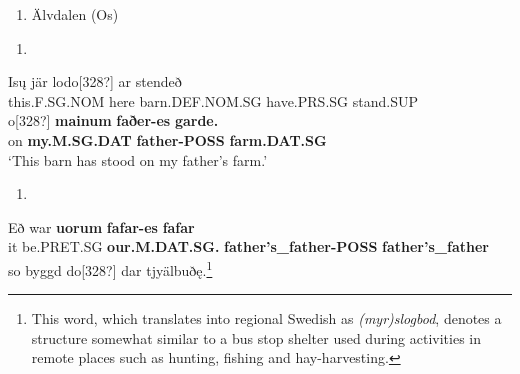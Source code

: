 \begin{enumerate} %
\item 
Älvdalen (Os)

\end{enumerate} %
\setcounter{listLFOxcviiileveli}{0}
\begin{enumerate} %
\item 
\end{enumerate} %
\ea\label{}
\gll Is\k{u}  jär  lodo[328?]  ar  stendeð\\


this.F.SG.NOM  here  barn.DEF.NOM.SG  have.PRS.SG  stand.SUP\\ %


\ea\label{}
\gll o[328?]  \textbf{mainum} \textbf{faðer-es } \textbf{garde.} \\


on  \textbf{my.M.SG.DAT} \textbf{father-POSS} \textbf{farm.DAT.SG} \\ %


‘This barn has stood on my father’s farm.’
\z


\begin{enumerate} %
\item 
\end{enumerate} %
\ea\label{}
\gll Eð  war  \textbf{uorum}\textbf{  fafar-es}\textbf{  fafar}\\


it  be.PRET.SG  \textbf{our.M.DAT.SG.} \textbf{father’s\_father-POSS} \textbf{father’s\_father}\\ %


\ea\label{}
\gll so  byggd  do[328?]  dar  tjyälbuðę.\footnote{ This word, which translates into regional Swedish as\textit{ (myr)slogbod}, denotes a structure somewhat similar to a bus stop shelter used during activities in remote places such as hunting, fishing and hay-harvesting.}\\


